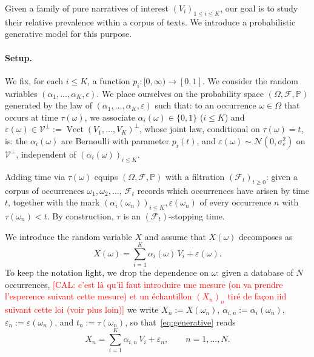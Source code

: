\documentclass[
  journal=medium,
  manuscript=article-type,
  year=2025,
  volume=1,
]{cup-journal}
\begin{document}
Given a family of pure narratives of interest $(V_i)_{1\le i\le K}$, our goal is to study their relative prevalence within a corpus of texts. We introduce a probabilistic generative model for this
purpose.


\paragraph{Setup.}
We fix, for each $i\le K$, a function $p_i:[0,\infty)\to[0,1]$. We consider the random variables $(\alpha_1, ..., \alpha_K, \epsilon)$.
We place ourselves on the probability space
$(\Omega,\mathcal F,\mathbb P)$ generated by the law of
$(\alpha_1,\ldots,\alpha_K,\varepsilon)$ such that: to an occurrence $\omega\in\Omega$ that occurs at time $\tau(\omega)$, we associate
$\alpha_i(\omega)\in\{0,1\}$ ($i\le K$) and $\varepsilon(\omega)\in\mathcal
V^\perp := \operatorname{Vect}(V_1,\ldots,V_K)^\perp$, whose joint law,
conditional on $\tau(\omega)=t$, is: the $\alpha_i(\omega)$ are Bernoulli with
parameter $p_i(t)$, and $\varepsilon(\omega)\sim\mathcal
N(0,\sigma_\varepsilon^2)$ on $\mathcal V^\perp$, independent of
$(\alpha_i(\omega))_{i\le K}$.

Adding time via $\tau(\omega)$ equips $(\Omega,\mathcal F,\mathbb P)$ with a
filtration $(\mathcal F_t)_{t\ge0}$: given a corpus of occurrences
$\omega_1,\omega_2,\ldots$, $\mathcal F_t$ records which occurrences have
arisen by time $t$, together with the mark $(\alpha_i(\omega_n))_{i\le
K},\varepsilon(\omega_n)$ of every occurrence $n$ with $\tau(\omega_n) < t$.
By construction, $\tau$ is an $(\mathcal F_t)$-stopping time.


We introduce the random variable $X$ and assume that $X(\omega)$ decomposes as
\begin{equation}
    \label{eq:generative}
    X(\omega) = \sum_{i=1}^K \alpha_i(\omega)\, V_i + \varepsilon(\omega).
\end{equation}
To keep the notation light, we drop the dependence on $\omega$:
given a database of $N$ occurrences, \textcolor{red}{[CAL: c'est là qu'il faut introduire une mesure (on va prendre l'esperence suivant cette mesure) et un échantillon $(X_n)_n$ tiré de façon iid suivant cette loi (voir plus loin)]} we write $X_n := X(\omega_n)$,
$\alpha_{i,n} := \alpha_i(\omega_n)$, $\varepsilon_n := \varepsilon(\omega_n)$,
and $t_n := \tau(\omega_n)$, so that~\eqref{eq:generative} reads
\begin{equation}
    \label{eq:generative:n}
    X_n = \sum_{i=1}^K \alpha_{i,n}\, V_i + \varepsilon_n, \qquad n = 1,\ldots,N.
\end{equation}
\end{document}
